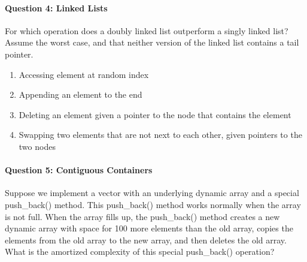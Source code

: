 \documentclass{article}
\begin{document}
\paragraph{Question 4: Linked Lists}
For which operation does a doubly linked list outperform a singly linked list? Assume the worst case, and that neither version of the linked list contains a tail pointer.
\begin{enumerate}[label=\Alph*.]
\item Accessing element at random index
\item Appending an element to the end
\item Deleting an element given a pointer to the node that contains the element
\item Swapping two elements that are not next to each other, given pointers to the two nodes
\end{enumerate}

\paragraph{Question 5: Contiguous Containers}
Suppose we implement a vector with an underlying dynamic array and a special push\_back() method. This push\_back() method works normally when the array is not full. When the array fills up, the push\_back() method creates a new dynamic array with space for 100 more elements than the old array, copies the elements from the old array to the new array, and then deletes the old array. What is the amortized complexity of this special push\_back() operation?
\end{document}

